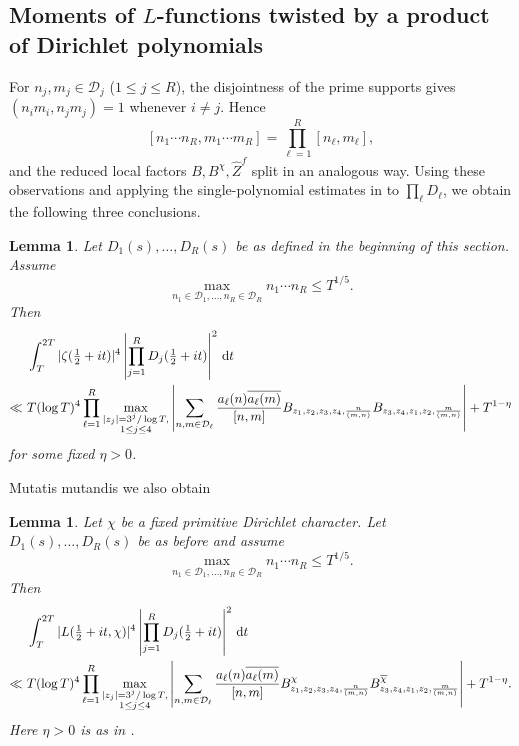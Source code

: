 \documentclass[oneside, 12pt]{amsart}
\newtheorem{lem}[thm]{Lemma}
\theoremstyle{definition}
\begin{document}
	\subsection{Moments of $L$-functions twisted by a product of Dirichlet polynomials}
	{For $n_j,m_j\in\mathcal D_j$ ($1\leq j\leq R$), the disjointness
		of the prime supports gives $(n_i m_i,n_j m_j)=1$ whenever $i\ne j$. Hence
		\[
		[n_1\cdots n_R,m_1\cdots m_R]=\prod_{\ell=1}^R[n_\ell,m_\ell],
		\]
		and the reduced local factors $B,B^\chi,\widehat Z^f$ split in an analogous way.
		Using these observations and applying the single-polynomial estimates in
		to $\prod_\ell D_\ell$, we obtain the following three conclusions.}
	\begin{lem}\label{zetaFourthMomentProductSplitting}
		Let $D_1(s),\dots,D_R(s)$ be as defined in the beginning of this section. Assume $$\max_{n_1 \in \mathcal{D}_1,\dots,n_R \in \mathcal{D}_R} n_1\cdots n_R \leq T^{1/5}.$$
		Then
		\begin{align*}
			&\int_T^{2T} |\zeta(\tfrac12+it)|^4\left|\prod_{j=1}^R D_j(\tfrac12+it)\right|^2 \, \textup{d}t \\
			\ll \,\, &{T(\log T)^4\prod_{\ell=1}^R \max_{\substack{|z_j|=3^j/\log T, \\ 1\leq j \leq 4}} \left|\sum_{n,m\in \mathcal{D}_\ell} \frac{a_\ell(n)\overline{a_\ell(m)}}{[n,m]}B_{z_1,z_2,z_3,z_4,\frac{n}{(m,n)}}B_{z_3,z_4,z_1,z_2,\frac{m}{(m,n)}}\right|+T^{1-\eta}}
		\end{align*}
		{for some fixed $\eta>0$.}
	\end{lem}  
	
	Mutatis mutandis we also obtain
	
	\begin{lem}\label{dirichletFourthMomentProductSplitting}
		Let $\chi$ be a fixed primitive Dirichlet character.  Let $D_1(s),\dots,D_R(s)$ be as before and assume $$\max_{n_1 \in \mathcal{D}_1,\dots,n_R \in \mathcal{D}_R} n_1\cdots n_R \leq T^{1/5}.$$ Then 
		\begin{align*}
			&\int_T^{2T} |L(\tfrac12+it,\chi)|^4\left|\prod_{j=1}^R D_j(\tfrac12+it)\right|^2 \, \textup{d}t \\
			\ll \,\, &{T(\log T)^4\prod_{\ell=1}^R \max_{\substack{|z_j|=3^j/\log T, \\ 1\leq j \leq 4}} \left|\sum_{n,m\in \mathcal{D}_\ell} \frac{a_\ell(n)\overline{a_\ell(m)}}{[n,m]}B^{\chi}_{z_1,z_2,z_3,z_4,\frac{n}{(m,n)}}B^{\overline{\chi}}_{z_3,z_4,z_1,z_2,\frac{m}{(m,n)}}\right|+T^{1-\eta}}.
		\end{align*}
		{Here $\eta>0$ is as in
			.}
	\end{lem}
	
\end{document}
